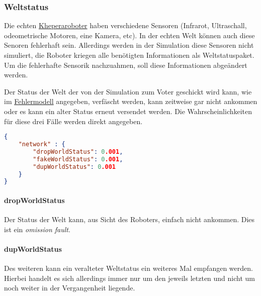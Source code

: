 \subsubsection{Weltstatus}
Die echten \hyperref[khepera]{Kheperaroboter} haben verschiedene Sensoren (Infrarot, Ultraschall,
odeometrische Motoren, eine Kamera, etc). In der echten Welt k{\"{o}}nnen auch diese Senoren fehlerhaft
sein. Allerdings werden in der Simulation diese Sensoren nicht simuliert, die Roboter kriegen alle
ben{\"{o}}tigten Informationen als Weltstatuspaket. Um die fehlerhafte Sensorik nachzuahmen, soll diese
Informationen abge{\"{a}}ndert werden.

Der Status der Welt der von der Simulation zum Voter geschickt wird kann, wie im \hyperref[fm]{Fehlermodell} angegeben, verf{\"{a}}scht werden, kann zeitweise gar
nicht ankommen oder es kann ein alter Status erneut versendet werden. Die Wahrscheinlichkeiten f{\"{u}}r diese drei F{\"{a}}lle werden direkt angegeben.
\begin{lstlisting}[frame=single, language=json] 
{
	"network" : {
		"dropWorldStatus": 0.001,
		"fakeWorldStatus": 0.001,
		"dupWorldStatus": 0.001
	}
}
\end{lstlisting}

\paragraph{dropWorldStatus} Der Status der Welt kann, aus Sicht des Roboters, einfach nicht ankommen. Dies
	ist ein \textit{omission fault}.
\paragraph{dupWorldStatus} Des weiteren kann ein veralteter Weltstatus ein weiteres Mal empfangen werden.
    Hierbei handelt es sich allerdings immer nur um den jeweils letzten und nicht um noch weiter in
	der Vergangenheit liegende.
